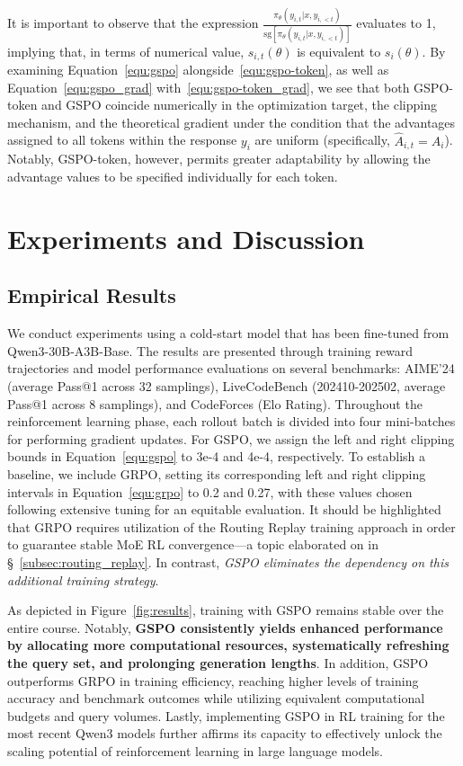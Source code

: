 It is important to observe that the expression $\frac{ \pi_{\theta} (y_{i,t} | x, y_{i,<t}) }{ \mathrm{sg} \left[ \pi_{\theta} (y_{i,t} | x, y_{i,<t}) \right] }$ evaluates to 1, implying that, in terms of numerical value, $s_{i,t}(\theta)$ is equivalent to $s_{i}(\theta)$. By examining Equation~\eqref{equ:gspo} alongside~\eqref{equ:gspo-token}, as well as Equation~\eqref{equ:gspo_grad} with~\eqref{equ:gspo-token_grad}, we see that both GSPO-token and GSPO coincide numerically in the optimization target, the clipping mechanism, and the theoretical gradient under the condition that the advantages assigned to all tokens within the response $y_i$ are uniform (specifically, $\widehat{A}_{i,t} = \widehat{A}_{i}$). Notably, GSPO-token, however, permits greater adaptability by allowing the advantage values to be specified individually for each token.

\section{Experiments and Discussion}

\subsection{Empirical Results}

We conduct experiments using a cold-start model that has been fine-tuned from Qwen3-30B-A3B-Base. The results are presented through training reward trajectories and model performance evaluations on several benchmarks: AIME'24 (average Pass@1 across 32 samplings), LiveCodeBench (202410-202502, average Pass@1 across 8 samplings), and CodeForces (Elo Rating). Throughout the reinforcement learning phase, each rollout batch is divided into four mini-batches for performing gradient updates. For GSPO, we assign the left and right clipping bounds in Equation~\eqref{equ:gspo} to 3e-4 and 4e-4, respectively. To establish a baseline, we include GRPO, setting its corresponding left and right clipping intervals in Equation~\eqref{equ:grpo} to 0.2 and 0.27, with these values chosen following extensive tuning for an equitable evaluation. It should be highlighted that GRPO requires utilization of the Routing Replay training approach in order to guarantee stable MoE RL convergence—a topic elaborated on in \S~\ref{subsec:routing_replay}. In contrast, \textit{GSPO eliminates the dependency on this additional training strategy}.

As depicted in Figure~\ref{fig:results}, training with GSPO remains stable over the entire course. Notably, \textbf{GSPO consistently yields enhanced performance by allocating more computational resources, systematically refreshing the query set, and prolonging generation lengths}. In addition, GSPO outperforms GRPO in training efficiency, reaching higher levels of training accuracy and benchmark outcomes while utilizing equivalent computational budgets and query volumes. Lastly, implementing GSPO in RL training for the most recent Qwen3 models further affirms its capacity to effectively unlock the scaling potential of reinforcement learning in large language models.

